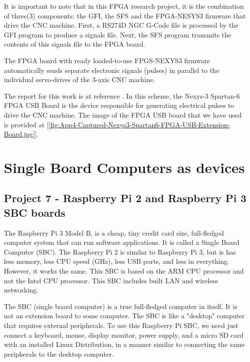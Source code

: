 It is important to note that in this FPGA research project, it is the combination of three(3) components: the GFI, the SFS and the FPGA-NESYS3 firmware that drive the CNC machine. First, a RS274D NGC G-Code file is processed by the GFI program to produce a signals file. Next, the SFS program transmits the contents of this signals file to the FPGA board. 
\vspace*{1\baselineskip}

The FPGA board with ready loaded-to-use FPGS-NEXYS3 firmware automatically sends separate electronic signals (pulses) in parallel to the individual servo-drives of the 3-axis CNC machine.
\vspace*{1\baselineskip}

The report for this work is at reference \cite{FYP_Charles_2014}. In this scheme, the Nexys-3 Spartan-6 FPGA USB Board is the device responsible for generating electrical pulses to drive the CNC machine. The image of the  FPGA USB board that we have used is provided at [\ref{fig:App4-Captured-Nexys3-Spartan6-FPGA-USB-Extension-Board.jpg}].


\section{Single Board Computers as devices}

\subsection{Project 7 - Raspberry Pi 2 and Raspberry Pi 3 SBC boards}

The Raspberry Pi 3 Model B, is a cheap, tiny credit card size, full-fledged computer system that can run software applications. It is called a Single Board Computer (SBC). The Raspberry Pi 2 is similar to Raspberry Pi 3, but is has less memory, less CPU speed (GHz), less USB ports, and less in everything. However, it works the same. This SBC is based on the ARM CPU processor and not the Intel CPU processor. This SBC includes built LAN and wireless networking. 
\vspace*{1\baselineskip}

The SBC (single board computer) is a true full-fledged computer in itself. It is not an extension board to some computer. The SBC is like a "desktop" computer that requires external peripherals. To use this Raspberry Pi SBC, we need just connect a keyboard, mouse, display monitor, power supply, and a micro SD card with an installed Linux Distribution, in a manner similar to connecting the same peripherals to the desktop computer. 
\vspace*{1\baselineskip}

